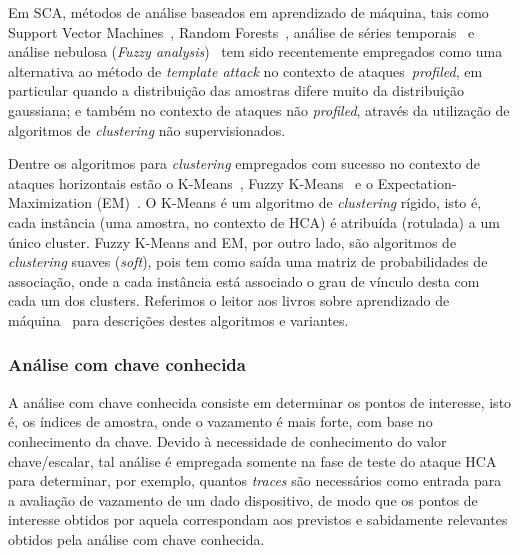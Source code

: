 \documentclass{SBCbookchapter}
\begin{document}
Em SCA, métodos de análise baseados em aprendizado de máquina, tais como Support Vector Machines~\cite{Bartkewitz2013}, Random Forests~\cite{Lerman2014RFandSOM}, análise de séries temporais~\cite{Lerman2013} e análise nebulosa (\textit{Fuzzy analysis})~\cite{SaeediKong2014}  tem sido recentemente empregados como uma alternativa ao método de \emph{template attack} no contexto de ataques~\textit{profiled}, em particular quando a distribuição das amostras difere muito da distribuição gaussiana; e também no contexto de ataques não \textit{profiled}, através da utilização de algoritmos de \emph{clustering} não supervisionados.


Dentre os algoritmos para \emph{clustering} empregados com sucesso no contexto de ataques horizontais estão o K-Means~\cite{Forgy1965KMeans, Lloyd1982KMeans}, Fuzzy K-Means~\cite{Dunn1973FuzzyKMeans} e o Expectation-Maximization (EM)~\cite{DempsterLairdRubin1977EMAlg}. O K-Means é um algoritmo de \emph{clustering} rígido, isto é, cada instância (uma amostra, no contexto de HCA) é atribuída (rotulada) a um único cluster. Fuzzy K-Means and EM, por outro lado, são algoritmos de \emph{clustering} suaves (\textit{soft}), pois tem como saída uma matriz de probabilidades de associação, onde a cada instância está associado o grau de vínculo desta com cada um dos clusters. Referimos o leitor aos livros sobre aprendizado de máquina~\cite{Alpaydin2014, WittenFrank2011, Han2011, Bishop2007, DudaHartStork2001} para descrições destes algoritmos e variantes.


\subsubsection{Análise com chave conhecida}

A análise com chave conhecida consiste em determinar os pontos de interesse, isto é, os índices de amostra, onde o vazamento é mais forte, com base no conhecimento da chave. Devido à necessidade de conhecimento do valor chave/escalar, tal análise é empregada somente na fase de teste do ataque HCA para determinar, por exemplo, quantos \emph{traces} são necessários como entrada para a avaliação de vazamento de um dado dispositivo, de modo que os pontos de interesse obtidos por aquela correspondam aos previstos e sabidamente relevantes obtidos pela análise com chave conhecida.
\end{document}
